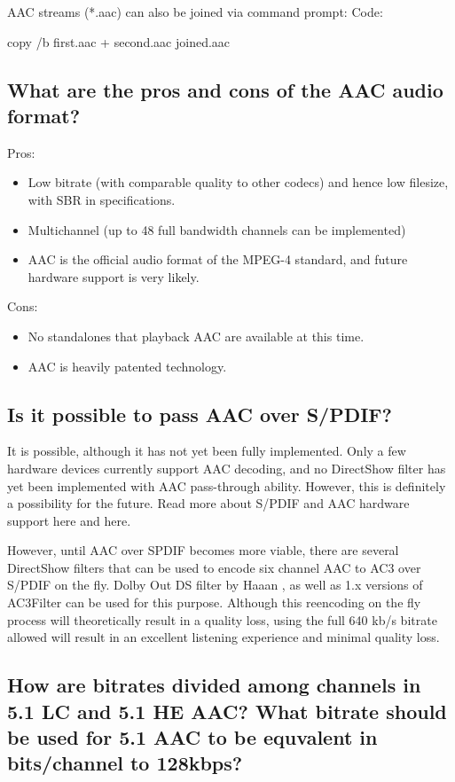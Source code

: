 ﻿\documentclass[12pt]{article}
\begin{document}
AAC streams (*.aac) can also be joined via command prompt:
Code:

copy /b first.aac + second.aac joined.aac

\subsection{What are the pros and cons of the AAC audio format?}

Pros:
\begin{itemize}
  \item Low bitrate (with comparable quality to other codecs) and hence low filesize, with SBR in
  specifications.
  \item Multichannel (up to 48 full bandwidth channels can be implemented)
  \item AAC is the official audio format of the MPEG-4 standard, and future hardware support is very likely.
\end{itemize}

Cons:
\begin{itemize}
  \item No standalones that playback AAC are available at this time.
  \item AAC is heavily patented technology.
\end{itemize}


\subsection{Is it possible to pass AAC over S/PDIF?}

It is possible, although it has not yet been fully implemented. Only a few hardware devices
currently support AAC decoding, and no DirectShow filter has yet been implemented with AAC
pass-through ability. However, this is definitely a possibility for the future. Read more about
S/PDIF and AAC hardware support here and here.

However, until AAC over SPDIF becomes more viable, there are several DirectShow filters that can be
used to encode six channel AAC to AC3 over S/PDIF on the fly. Dolby Out DS filter by Haaan , as well
as 1.x versions of AC3Filter can be used for this purpose. Although this reencoding on the fly
process will theoretically result in a quality loss, using the full 640 kb/s bitrate allowed will
result in an excellent listening experience and minimal quality loss.

\subsection{How are bitrates divided among channels in 5.1 LC and 5.1 HE AAC? What bitrate should be used for 5.1 AAC to be equvalent in bits/channel to 128kbps?}
\end{document}
